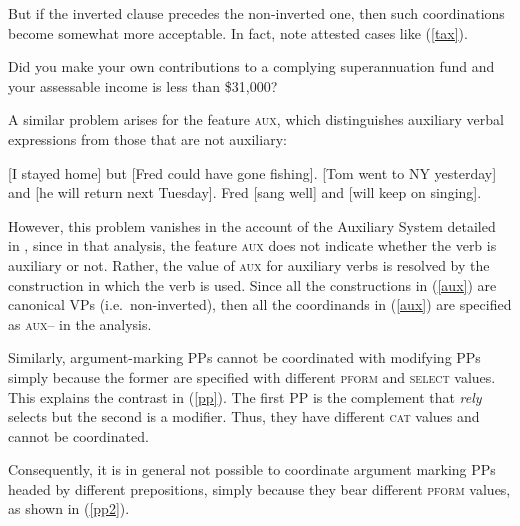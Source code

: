 \eal
{}
\zl

\noindent
But if the inverted clause precedes the non-inverted one, then such coordinations become somewhat
more acceptable. In fact, \citet[1332--1333]{rodney} note attested cases like (\ref{tax}).

\ea
Did you make your own contributions to a complying superannuation fund and
your assessable income is less than \$31,000?\label{tax}\label{ex-did-you-make-and-your-asessable-income-is}
\z

\noindent
A similar problem arises for the feature \textsc{aux}, which distinguishes auxiliary verbal expressions from those that
are not auxiliary:

\ealnoraggedright
\label{aux}
\ex {}[I stayed home]\sub{\aux $-$} but [Fred could have gone fishing]\sub{\aux $+$}.
\ex {}[Tom went to NY yesterday]\sub{\aux $-$} and [he will return next Tuesday]\sub{\aux $+$}.
\ex Fred [sang well]\sub{\aux $-$} and [will keep on singing]\sub{\aux $+$}.
\zl

\noindent
However, this problem vanishes in the account of the  Auxiliary System detailed in
\citet{SagEtAl20}, since in that analysis, the feature \textsc{aux} does not indicate whether the
verb is auxiliary or not. Rather, the value of \textsc{aux} for auxiliary verbs is resolved by the
construction in which the verb is used. Since all the constructions in (\ref{aux}) are canonical VPs
(i.e.\ non-inverted), then all the coordinands in (\ref{aux}) are specified as \textsc{aux--} in the
\citet{SagEtAl20} analysis.

\largerpage[2]
Similarly, argument-marking PPs cannot be coordinated with modifying PPs simply because the former
are specified with different \textsc{pform} and \textsc{select} values. This explains the contrast
in (\ref{pp}). The first PP is the complement that \emph{rely} selects but the second is a
modifier. Thus, they have different \textsc{cat} values and cannot be coordinated.


\eal
\label{pp}
\zl

\noindent
Consequently, it is in general not possible to coordinate argument marking PPs headed by different prepositions, simply because they bear
different \textsc{pform} values, as shown in (\ref{pp2}).

